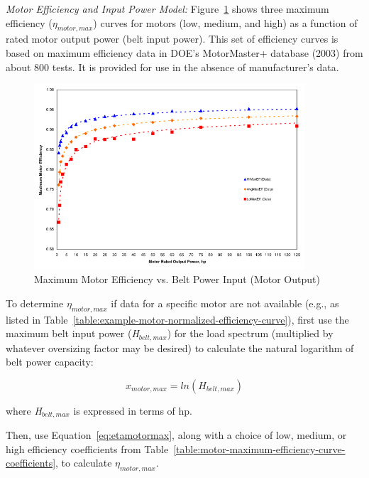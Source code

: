 \emph{Motor Efficiency and Input Power Model:} Figure~\ref{fig:maximum-motor-efficiency-vs.-belt-power-input} shows three maximum efficiency (\(\eta_{motor,max}\)) curves for motors (low, medium, and high) as a function of rated motor output power (belt input power). This set of efficiency curves is based on maximum efficiency data in DOE's MotorMaster+ database (2003) from about 800 tests. It is provided for use in the absence of manufacturer's data.

\begin{figure}[hbtp] %
\centering
\includegraphics[width=0.9\textwidth, height=0.9\textheight, keepaspectratio=true]{media/image4917.svg.png}
\caption{Maximum Motor Efficiency vs. Belt Power Input (Motor Output) \protect \label{fig:maximum-motor-efficiency-vs.-belt-power-input}}
\end{figure}

To determine \(\eta_{motor,max}\) if data for a specific motor are not available (e.g., as listed in Table~\ref{table:example-motor-normalized-efficiency-curve}), first use the maximum belt input power (\emph{H\(_{belt,max}\)}) for the load spectrum (multiplied by whatever oversizing factor may be desired) to calculate the natural logarithm of belt power capacity:

\begin{equation}
x_{motor,max} = ln({H_{belt,max}})
\end{equation}

where \emph{H\(_{belt,max}\)} is expressed in terms of hp.

Then, use Equation~\ref{eq:etamotormax}, along with a choice of low, medium, or high efficiency coefficients from Table~\ref{table:motor-maximum-efficiency-curve-coefficients}, to calculate \(\eta_{motor,max}\).

